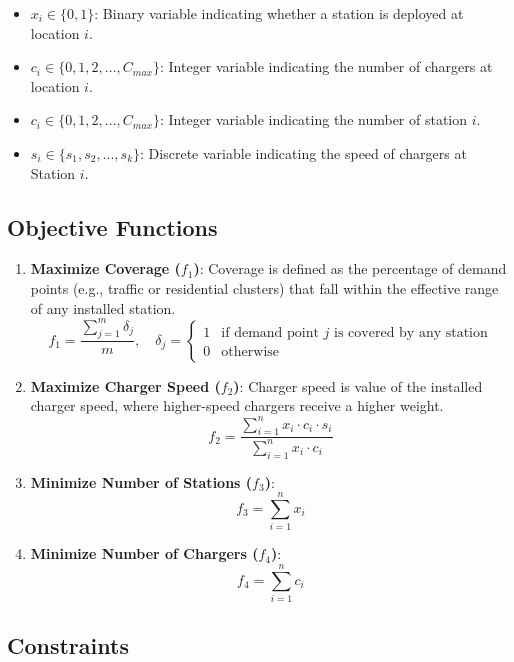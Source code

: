 \begin{itemize}
    \item $x_i \in \{0,1\}$: Binary variable indicating whether a station is deployed at location $i$.
    \item $c_i \in \{0, 1, 2, ..., C_{max}\}$: Integer variable indicating the number of chargers at location $i$.
    \item $c_i \in \{0, 1, 2, ..., C_{max}\}$: Integer variable indicating the number of station $i$.
    \item $s_i \in \{s_1, s_2, ..., s_k\}$: Discrete variable indicating the speed of chargers at Station $i$.
\end{itemize}

\subsection{Objective Functions}

\begin{enumerate}
    \item \textbf{Maximize Coverage ($f_1$)}: Coverage is defined as the percentage of demand points (e.g., traffic or residential clusters) that fall within the effective range of any installed station. 
    \[
    f_1 = \frac{\sum_{j=1}^{m} \delta_j}{m}, \quad \delta_j = \begin{cases}
    1 & \text{if demand point } j \text{ is covered by any station} \\
    0 & \text{otherwise}
    \end{cases}
    \]

    \item \textbf{Maximize Charger Speed ($f_2$)}: Charger speed is value of the installed charger speed, where higher-speed chargers receive a higher weight.
    \[
    f_2 = \frac{\sum_{i=1}^{n} x_i \cdot c_i \cdot s_i}{\sum_{i=1}^{n} x_i \cdot c_i}
    \]

    \item \textbf{Minimize Number of Stations ($f_3$)}:
    \[
    f_3 = \sum_{i=1}^{n} x_i
    \]

    \item \textbf{Minimize Number of Chargers ($f_4$)}:
    \[
    f_4 = \sum_{i=1}^{n} c_i
    \]
\end{enumerate}


\subsection{Constraints}

